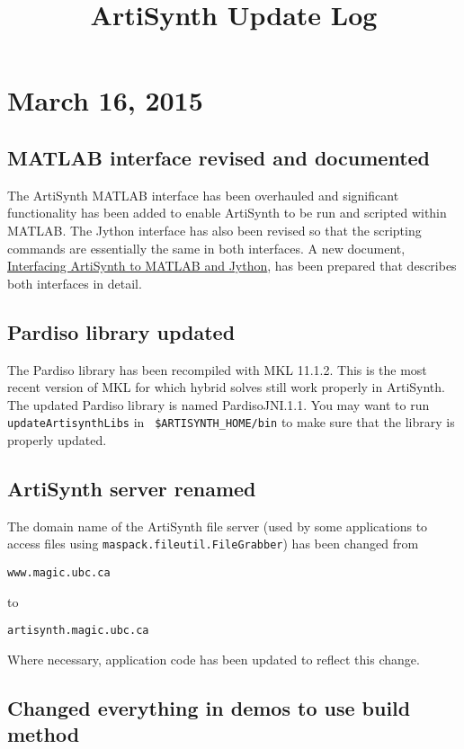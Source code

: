 \documentclass{article}
\title{ArtiSynth Update Log}
\date{}
\begin{document}
\section*{March 16, 2015}

\subsection*{MATLAB interface revised and documented}

The ArtiSynth MATLAB interface has been overhauled and significant
functionality has been added to enable ArtiSynth to be run and
scripted within MATLAB. The Jython interface has also been revised so
that the scripting commands are essentially the same in both
interfaces. A new document,
\href{http://www.artisynth.org/doc/html/matlabAndJython/matlabAndJython.html}%
{Interfacing ArtiSynth to MATLAB and Jython}, has been prepared that
describes both interfaces in detail.

\subsection*{Pardiso library updated}

The Pardiso library has been recompiled with MKL 11.1.2. This is the
most recent version of MKL for which hybrid solves still work properly
in ArtiSynth. The updated Pardiso library is named PardisoJNI.1.1.
You may want to run {\tt updateArtisynthLibs} in {\tt
\$ARTISYNTH\_HOME/bin} to make sure that the library is properly
updated.

\subsection*{ArtiSynth server renamed}

The domain name of the ArtiSynth file server (used by some applications
to access files using {\tt maspack.fileutil.FileGrabber}) has
been changed from 
\begin{verbatim}
www.magic.ubc.ca
\end{verbatim}
to
\begin{verbatim}
artisynth.magic.ubc.ca
\end{verbatim}
Where necessary, application code has been
updated to reflect this change.

\subsection*{Changed everything in demos to use build method}
\end{document}
